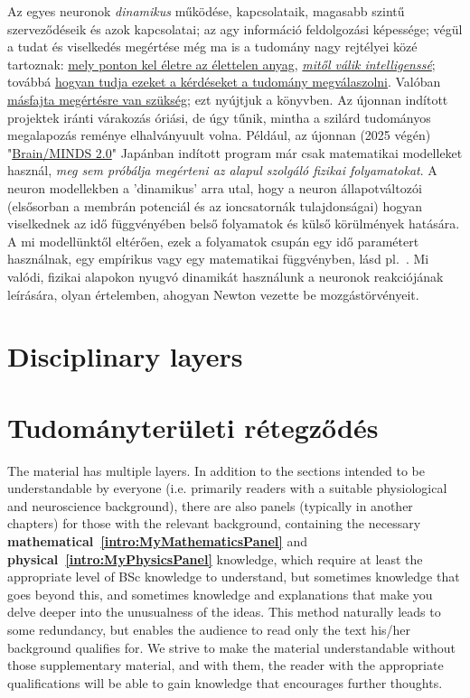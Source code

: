 \else

Az egyes neuronok \textit{dinamikus} működése, kapcsolataik,
magasabb szintű szer\-veződéseik és azok kapcsolatai;
az agy információ feldolgozási képessége; végül 
a tudat és viselkedés megértése még ma is a tudomány 
nagy rejtélyei közé tartoznak:
\hyperlink{LivingMatter}
{mely ponton kel életre az élettelen anyag}, \textit{\hyperlink{CognitiveMatter}{mitől válik intelligenssé}}; továbbá \hyperlink{PhysicalPictureNeuron}{hogyan tudja ezeket a kérdéseket a tudomány megválaszolni}. 
Valóban \hyperlink{NewUnderstanding}
{másfajta megértésre van szükség}; ezt nyújtjuk a könyvben.
%
Az újonnan indított projektek iránti várakozás óriási, 
de úgy tűnik, mintha a szilárd tudományos megalapozás reménye
elhalványuult volna.
Például, az újonnan (2025 végén) "\href{https://brainminds.jp/en}{Brain/MINDS 2.0}" Japánban indított program  már csak 
matematikai modelleket használ, \textit{meg sem próbálja megérteni az alapul szolgáló fizikai folyamatokat}.
A neuron model\-lekben a 'dinamikus' arra utal, hogy a neuron
állapotváltozói (elsősorban a membrán potenciál és az ion\-csatornák tulajdonságai) hogyan viselkednek az idő függvényében belső folyamatok és külső körülmények hatására.
A mi model\-lünktől eltérően, ezek a folyamatok csupán egy 
idő paramétert használnak, egy empírikus vagy egy matematikai függvényben, lásd pl.~\cite{NeuralDynamicsGertsner:2014}.
Mi valódi, fizikai alapokon nyugvó dinamikát használunk a neuronok reakciójának leírására, olyan értelemben, ahogyan Newton vezette be mozgástörvényeit.

\fi
{}

\ifx\magyar\undefined
\section{Disciplinary layers\label{sec:Intro-Disciplinary}}
\else
\section{Tudományterületi rétegződés\label{sec:Intro-Disciplinary}}
\fi


\ifx\magyar\undefined

The material has multiple layers.
In addition to the sections intended to be understandable by everyone
(i.e. primarily readers with a suitable physiological and neuroscience background),
there are also panels (typically in another chapters) for those with the relevant background,
containing the necessary \textbf{mathematical~\ref{intro:MyMathematicsPanel}}
and \textbf{physical~\ref{intro:MyPhysicsPanel}} knowledge,
which require at least the appropriate level of BSc knowledge to understand,
but sometimes knowledge that goes beyond this, and sometimes
knowledge and explanations that make you delve deeper into the unusualness of the ideas. This method naturally leads
to some redundancy, but enables the audience to read only
the text his/her background qualifies for.
 We strive to make the material understandable without those supplementary material, and with them, the reader with the appropriate qualifications
will be able to gain knowledge that encourages further thoughts.

